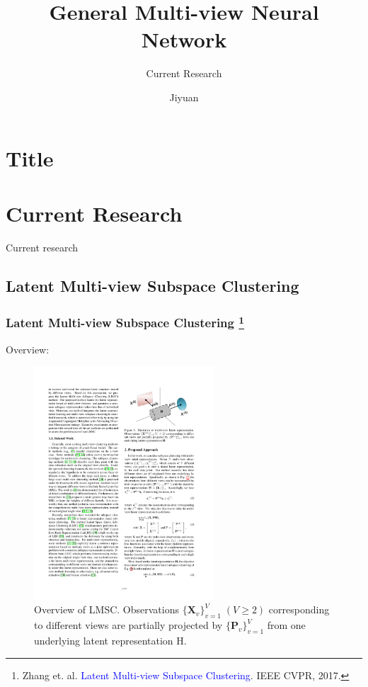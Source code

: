 \documentclass[notheorems, aspectratio=54]{beamer}
\title[]{General Multi-view Neural Network}
\subtitle{Current Research}
\author{Jiyuan}
\institute[NUDT]{liujiyuan13@nudt.edu.cn}
\begin{document}
\section{Title}
\begin{frame}
    \titlepage
\end{frame}

\section{Current Research}

\begin{frame}
    
    \centering
    \LARGE Current research
    
\end{frame}

\subsection{Latent Multi-view Subspace Clustering}

\begin{frame} \frametitle{Latent Multi-view Subspace Clustering \footnote{Zhang et. al. \textcolor{blue}{Latent Multi-view Subspace Clustering}. IEEE CVPR, 2017.}}

Overview:

\begin{figure}
\centering
\includegraphics[width=0.6\textwidth]{./fig/overview_lmsc.pdf}
\caption{Overview of LMSC. Observations $\{\mathbf{X}_v\}_{v=1}^V\;(V\geq 2)$ corresponding to different views are partially projected by $\{\mathbf{P}_v\}_{v=1}^V$ from one underlying latent representation H.}
\label{fig:overview_lmsc}
\end{figure}

\end{frame}
\end{document}
